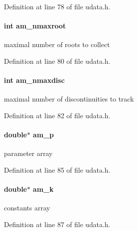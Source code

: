 Definition at line 78 of file udata.\+h.

\hypertarget{struct_user_data_a2c6b0a170bd534f68ab5b216629055a8}{}
\paragraph[{am\+\_\+nmaxroot}]{\setlength{\rightskip}{0pt plus 5cm}int am\+\_\+nmaxroot}\label{struct_user_data_a2c6b0a170bd534f68ab5b216629055a8}
maximal number of roots to collect 

Definition at line 80 of file udata.\+h.

\hypertarget{struct_user_data_a57c79c232bf5d88b7dd1b3cb5947366b}{}
\paragraph[{am\+\_\+nmaxdisc}]{\setlength{\rightskip}{0pt plus 5cm}int am\+\_\+nmaxdisc}\label{struct_user_data_a57c79c232bf5d88b7dd1b3cb5947366b}
maximal number of discontinuities to track 

Definition at line 82 of file udata.\+h.

\hypertarget{struct_user_data_a1a679b0e8dfea7d284d777c937d8d13e}{}
\paragraph[{am\+\_\+p}]{\setlength{\rightskip}{0pt plus 5cm}double$\ast$ am\+\_\+p}\label{struct_user_data_a1a679b0e8dfea7d284d777c937d8d13e}
parameter array 

Definition at line 85 of file udata.\+h.

\hypertarget{struct_user_data_a7b59855746129befdcfe9f3c8a4d2a4c}{}
\paragraph[{am\+\_\+k}]{\setlength{\rightskip}{0pt plus 5cm}double$\ast$ am\+\_\+k}\label{struct_user_data_a7b59855746129befdcfe9f3c8a4d2a4c}
constants array 

Definition at line 87 of file udata.\+h.


